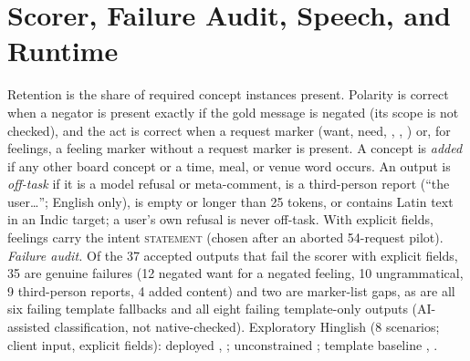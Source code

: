 



\section{Scorer, Failure Audit, Speech, and Runtime}
\label{app:scorer}\label{app:coverage}
Retention is the share of required concept instances present. Polarity is correct when a negator is present exactly if the gold message is negated (its scope is not checked), and the act is correct when a request marker (want, need, , , ) or, for feelings, a feeling marker without a request marker is present. A concept is \emph{added} if any other board concept or a time, meal, or venue word occurs.
An output is \emph{off-task} if it is a model refusal or meta-comment, is a third-person report (``the user\ldots''; English only), is empty or longer than 25 tokens, or contains Latin text in an Indic target; a user's own refusal is never off-task. With explicit fields, feelings carry the intent \textsc{statement} (chosen after an aborted 54-request pilot).
\emph{Failure audit.} Of the 37 accepted outputs that fail the scorer with explicit fields, 35 are genuine failures (12 negated want for a negated feeling, 10 ungrammatical, 9 third-person reports, 4 added content) and two are marker-list gaps, as are all six failing template fallbacks and all eight failing template-only outputs (AI-assisted classification, not native-checked).
Exploratory Hinglish (8 scenarios; client input, explicit fields): deployed \CMSuccDepU{}, \CMSuccDepS{}; unconstrained \CMSuccNaive{}; template baseline \CMSuccTmplU{}, \CMSuccTmplS{}.



